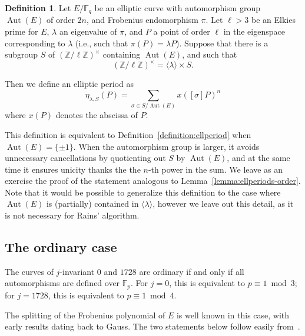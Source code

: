 \documentclass[12pt]{article}
\theoremstyle{plain}
\theoremstyle{definition}
\newtheorem{definition}[theorem]{Definition}
\DeclareMathOperator{\Aut}{Aut}
\def\Z{\ensuremath{\mathbb{Z}}}
\def\F{\ensuremath{\mathbb{F}}}
\newcounter{algorithm}
\begin{document}
\begin{definition}
  \label{definition:ellperiod-general}
  Let $E/\F_q$ be an elliptic curve with automorphism group $\Aut(E)$
  of order $2n$, and Frobenius endomorphism $\pi$. %
  Let $\ell > 3$ be an Elkies prime for $E$, $\lambda$ an eigenvalue
  of $\pi$, and $P$ a point of order $\ell$ in the eigenspace
  corresponding to $\lambda$ (i.e., such that $\pi(P)=\lambda P$). %
  Suppose that there is a subgroup $S$ of $(\Z/\ell\Z)^{\times}$
  containing $\Aut(E)$, and such that
  \begin{equation*}
    (\Z/\ell\Z)^{\times} = \langle{\lambda}\rangle \times S.
  \end{equation*}
  
  Then we define an elliptic period as
  \begin{equation*}
    \eta_{\lambda,S}(P) =
    \sum_{\sigma\in S/\Aut(E)} {x\left([\sigma] P \right)^n} 
  \end{equation*}
  where $x(P)$ denotes the abscissa of $P$.
\end{definition}

This definition is equivalent to Definition~\ref{definition:ellperiod}
when $\Aut(E)=\{\pm1\}$. %
When the automorphism group is larger, it avoids unnecessary
cancellations by quotienting out $S$ by $\Aut(E)$, and at the same
time it ensures unicity thanks the the $n$-th power in the sum. %
We leave as an exercise the proof of the statement analogous to
Lemma~\ref{lemma:ellperiods-order}. %
Note that it would be possible to generalize this definition to the
case where $\Aut(E)$ is (partially) contained in
$\langle{\lambda}\rangle$, however we leave out this detail, as it is
not necessary for Rains' algorithm.


\subsection{The ordinary case}

The curves of $j$-invariant $0$ and $1728$ are ordinary if and only if
all automorphisms are defined over $\F_p$. %
For $j=0$, this is equivalent to $p\equiv 1 \bmod 3$; for $j=1728$,
this is equivalent to $p\equiv 1 \bmod 4$. %

The splitting of the Frobenius polynomial of $E$ is well known in this
case, with early results dating back to Gauss. %
The two statements below follow easily
from~\cite[Th.~2.5,2.6]{silverberg2010group}.
\end{document}
